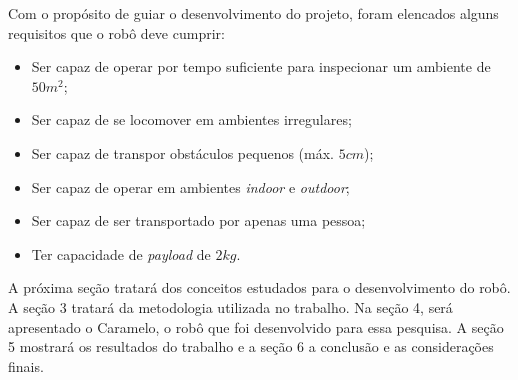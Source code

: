 \documentclass[../main.tex]{subfiles}
\begin{document}
Com o propósito de guiar o desenvolvimento do projeto, foram elencados alguns requisitos que o robô deve cumprir:

\begin{itemize}[noitemsep]
  \item Ser capaz de operar por tempo suficiente para inspecionar um ambiente de $50m^2$;
  \item Ser capaz de se locomover em ambientes irregulares;
  \item Ser capaz de transpor obstáculos pequenos (máx. $5cm$);
  \item Ser capaz de operar em ambientes \textit{indoor} e \textit{outdoor};
  \item Ser capaz de ser transportado por apenas uma pessoa;
  \item Ter capacidade de \textit{payload} de $2kg$.
\end{itemize}

A próxima seção tratará dos conceitos estudados para o desenvolvimento do robô. A seção 3 tratará da metodologia utilizada no trabalho. Na seção 4, será apresentado o Caramelo, o robô que foi desenvolvido para essa pesquisa. A seção 5 mostrará os resultados do trabalho e a seção 6 a conclusão e as considerações finais.  
\end{document}
